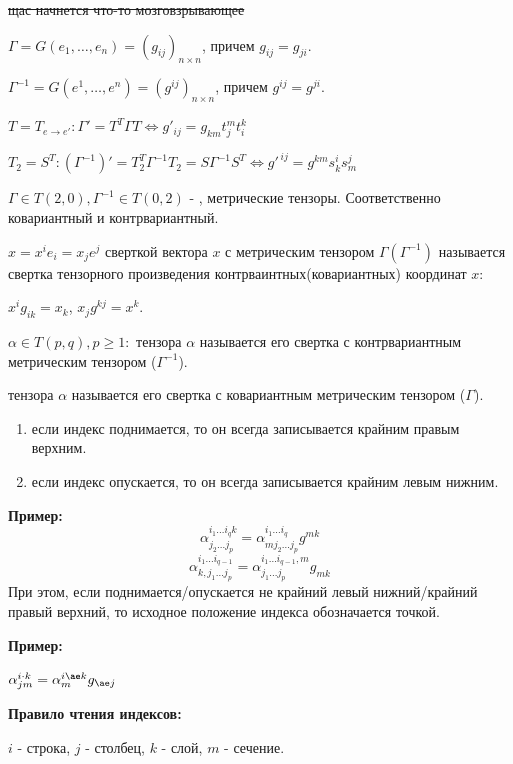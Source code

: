\sout{щас начнется что-то мозговзрывающее}

$\Gamma = G(e_1,\ldots,e_n)=(g_{ij})_{n \times n}$, причем $g_{ij}=g_{ji}$.

$\Gamma^{-1}= G(e^1,\ldots, e^n)= (g^{ij})_{n\times n}$, причем $g^{ij} = g^{ji}$.

$T = T_{e\rightarrow e'}: \Gamma' = T^T \Gamma T \Leftrightarrow g'_{ij}= g_{km}t_j^m t_i^k$

$T_2 = S^T: (\Gamma^{-1})' = T_2^T \Gamma^{-1} T_2 = S \Gamma^{-1}S^T \Leftrightarrow g'^{\, ij} = g^{km}s_k^i s_m^j$

 $\Gamma \in T(2,0), \Gamma^{-1}\in T(0,2)$ - , метрические тензоры. Соответственно ковариантный и контрвариантный.

 $x = x^ie_i = x_j e^j$ сверткой вектора $x$ с метрическим тензором $\Gamma(\Gamma^{-1})$ называется свертка тензорного произведения контрваинтных(ковариантных) координат $x$:

$x^i g_{ik} = x_k$, $x_j g^{kj}= x^k$.

 $\alpha \in T(p,q), p \geq 1:$  тензора $\alpha$ называется его свертка с контрвариантным метрическим тензором ($\Gamma^{-1}$).

 тензора $\alpha$ называется его свертка с ковариантным метрическим тензором ($\Gamma$).

\begin{enumerate}
    \item если индекс поднимается, то он всегда записывается крайним правым верхним.
    \item если индекс опускается, то он всегда записывается крайним левым нижним.
\end{enumerate}

\textbf{Пример:}
$$\alpha_{j_2\ldots j_p}^{i_1\ldots i_qk} = \alpha^{i_1\ldots i_q}_{mj_2\ldots j_p} g^{mk}$$
$$\alpha_{k,j_1\ldots j_p}^{i_1\ldots i_{q-1}} = \alpha^{i_1\ldots i_{q-1},m}_{j_1\ldots j_p} g_{mk}$$
При этом, если поднимается/опускается не крайний левый нижний/крайний правый верхний, то исходное положение индекса обозначается точкой. 

\textbf{Пример:}

$\alpha^{i \cdot k}_{jm} = \alpha^{i \ae k}_m g_{\ae j}$

\textbf{Правило чтения индексов:}

$i$ - строка, $j$ - столбец, $k$ - слой, $m$ - сечение.

